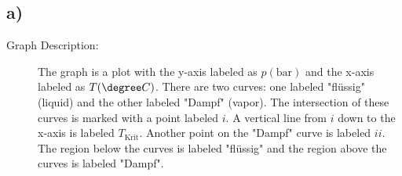 

\subsection*{a)}

\begin{description}
    \item[Graph Description:] The graph is a plot with the y-axis labeled as \( p(\text{bar}) \) and the x-axis labeled as \( T(\degree C) \). There are two curves: one labeled "flüssig" (liquid) and the other labeled "Dampf" (vapor). The intersection of these curves is marked with a point labeled \( i \). A vertical line from \( i \) down to the x-axis is labeled \( T_{\text{Krit}} \). Another point on the "Dampf" curve is labeled \( ii \). The region below the curves is labeled "flüssig" and the region above the curves is labeled "Dampf".
\end{description}